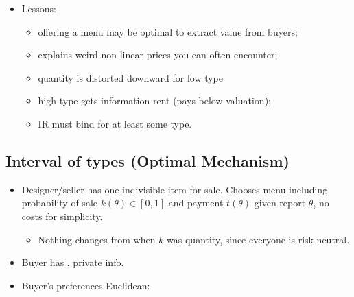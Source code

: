 \documentclass[english]{beamer}		%
\def\lyxframeend{} %
\begin{document}
\begin{itemize}
	\item Lessons:
	\begin{itemize}[<+->]
		\item offering a menu may be optimal to extract value from buyers;
		\item explains weird non-linear prices you can often encounter; %
		\item quantity is distorted downward for low type
		\item high type gets information rent (pays below valuation);
		\item IR must bind for at least some type.
	\end{itemize}
\end{itemize}
\lyxframeend


\subsection{Interval of types (Optimal Mechanism)}

\begin{itemize}
	\item Designer/seller has one indivisible item for sale. Chooses menu including probability of sale $k(\theta) \in [0,1]$ and payment $t(\theta)$ given report $\theta$, no costs for simplicity.
	\begin{itemize}
		\item Nothing changes from when $k$ was quantity, since everyone is risk-neutral.
	\end{itemize}
	\item Buyer has , private info.
	\item Buyer's preferences Euclidean: 
\end{itemize}
\lyxframeend
\end{document}
